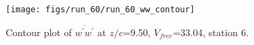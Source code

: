 \begin{figure}[H]
\centering
\texttt{[image: figs/run\_60/run\_60\_ww\_contour]}
\caption{Contour plot of $\overline{w^\prime w^\prime}$ at $z/c$=9.50, $V_{free}$=33.04, station 6.}
\label{fig:run_60_ww_contour}
\end{figure}


